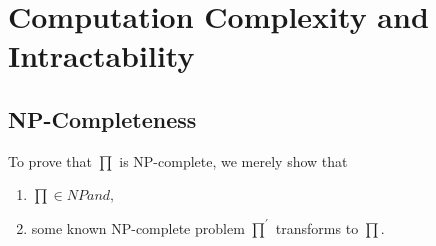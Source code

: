 \documentclass{article}
\begin{document}
\section{Computation Complexity and Intractability}

\subsection{NP-Completeness}

To prove that $\prod$ is NP-complete, we merely show that \cite{Garey:1990:CIG:574848}

\begin{enumerate}
\item $\prod \in NP and,$
\item some known NP-complete problem $\prod^\prime$ transforms to $\prod$.
\end{enumerate}



\end{document}
